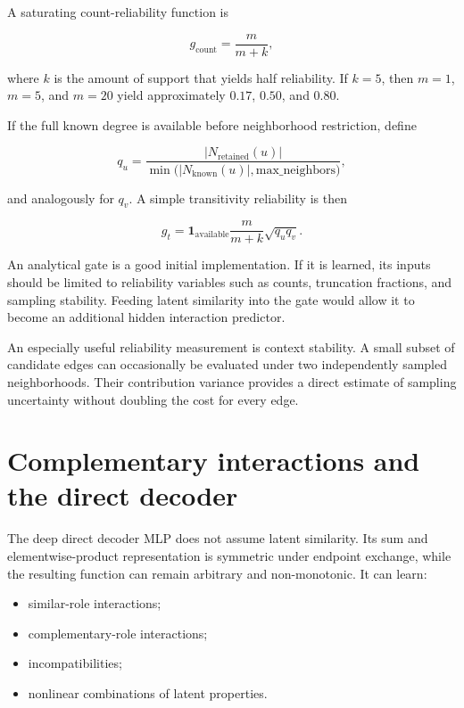 \documentclass[11pt,a4paper]{article}
\begin{document}
A saturating count-reliability function is

\begin{equation}
  g_{\mathrm{count}} = \frac{m}{m+k},
\end{equation}

where $k$ is the amount of support that yields half reliability. If $k=5$,
then $m=1$, $m=5$, and $m=20$ yield approximately $0.17$, $0.50$, and $0.80$.

If the full known degree is available before neighborhood restriction, define

\begin{equation}
  q_u =
  \frac{|N_{\mathrm{retained}}(u)|}
       {\min\bigl(|N_{\mathrm{known}}(u)|,\mathrm{max\_neighbors}\bigr)},
\end{equation}

and analogously for $q_v$. A simple transitivity reliability is then

\begin{equation}
  g_t =
  \mathbf{1}_{\mathrm{available}}
  \frac{m}{m+k}\sqrt{q_uq_v}.
\end{equation}

An analytical gate is a good initial implementation. If it is learned, its
inputs should be limited to reliability variables such as counts, truncation
fractions, and sampling stability. Feeding latent similarity into the gate
would allow it to become an additional hidden interaction predictor.

An especially useful reliability measurement is context stability. A small
subset of candidate edges can occasionally be evaluated under two independently
sampled neighborhoods. Their contribution variance provides a direct estimate
of sampling uncertainty without doubling the cost for every edge.

\section{Complementary interactions and the direct decoder}

The deep direct decoder MLP does not assume latent similarity. Its sum and
elementwise-product representation is symmetric under endpoint exchange, while
the resulting function can remain arbitrary and non-monotonic. It can learn:

\begin{itemize}
  \item similar-role interactions;
  \item complementary-role interactions;
  \item incompatibilities;
  \item nonlinear combinations of latent properties.
\end{itemize}
\end{document}
